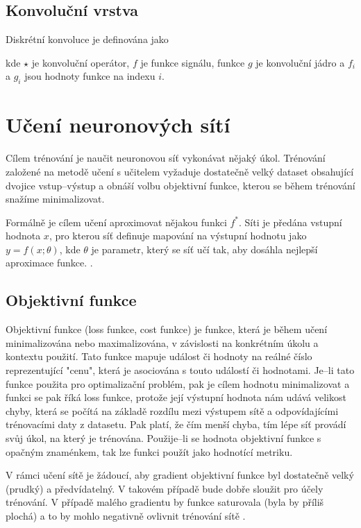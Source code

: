 \subsection{Konvoluční vrstva}
Diskrétní konvoluce je definována jako


kde $\star$ je konvoluční operátor, $f$ je funkce signálu, funkce $g$ je konvoluční jádro a $f_i$ a $g_i$ jsou hodnoty funkce na indexu $i$.



\section{Učení neuronových sítí}
Cílem trénování je naučit neuronovou síť vykonávat nějaký úkol. Trénování založené na metodě učení s učitelem vyžaduje dostatečně velký dataset obsahující dvojice vstup--výstup a obnáší volbu objektivní funkce, kterou se během trénování snažíme minimalizovat. 

Formálně je cílem učení aproximovat nějakou funkci $f^\ast$. Síti je předána vstupní hodnota $x$, pro kterou síť definuje mapování na výstupní hodnotu jako $y = f(x; \theta)$, kde $\theta$ je parametr, který se síť učí tak, aby dosáhla nejlepší aproximace funkce. \cite[p.~163]{mitdeeplearning}.


\subsection{Objektivní funkce}
Objektivní funkce (loss funkce, cost funkce) je funkce, která je během učení minimalizována nebo maximalizována, v závislosti na konkrétním úkolu a kontextu použití. Tato funkce mapuje událost či hodnoty na reálné číslo reprezentující  "cenu", která je asociována s touto událostí či hodnotami. Je--li tato funkce použita pro optimalizační problém, pak je cílem hodnotu minimalizovat a funkci se pak říká loss funkce, protože její výstupní hodnota nám udává velikost chyby, která se počítá na základě rozdílu mezi výstupem sítě a odpovídajícími trénovacími daty z datasetu. Pak platí, že čím menší chyba, tím lépe síť provádí svůj úkol, na který je trénována. Použije--li se hodnota objektivní funkce s opačným znaménkem, tak lze funkci použít jako hodnotící metriku.

V rámci učení sítě je žádoucí, aby gradient objektivní funkce byl dostatečně velký (prudký) a předvídatelný. V takovém případě bude dobře sloužit pro účely trénování. V případě malého gradientu by funkce saturovala (byla by příliš plochá) a to by mohlo negativně ovlivnit trénování sítě \cite{mitdeeplearning}. 

